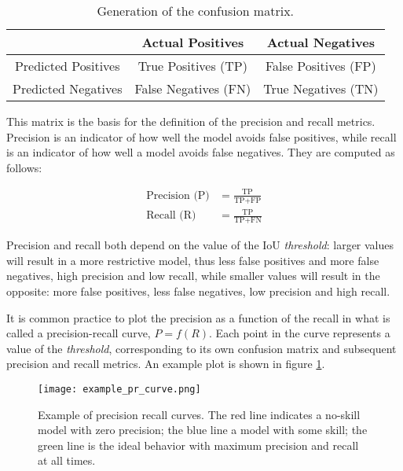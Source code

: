 \begin{table}[ht]
    \begin{center}
        \begin{tabular}{c||c|c}
            \space & Actual Positives & Actual Negatives\\
            \hline\hline
            Predicted Positives & True Positives (TP)& False Positives (FP)\\
            \hline
            Predicted Negatives & False Negatives (FN)& True Negatives (TN)\\
        \end{tabular}
        \caption{Generation of the confusion matrix.}
        \label{confusionmatrix}
    \end{center}
\end{table}

This matrix is the basis for the definition of the precision and recall metrics. Precision is an indicator of how well the model avoids false positives, while recall is an indicator of how well a model avoids false negatives. They are computed as follows:

\begin{align*}
    \text{Precision (P)} &= \frac{\text{TP}}{\text{TP} + \text{FP}}\\
    \text{Recall (R)} &= \frac{\text{TP}}{\text{TP} + \text{FN}}
\end{align*}

Precision and recall both depend on the value of the IoU \emph{threshold}: larger values will result in a more restrictive model, thus less false positives and more false negatives, high precision and low recall, while smaller values will result in the opposite: more false positives, less false negatives, low precision and high recall.

It is common practice to plot the precision as a function of the recall in what is called a precision-recall curve, $P = f(R)$. Each point in the curve represents a value of the \emph{threshold}, corresponding to its own confusion matrix and subsequent precision and recall metrics. An example plot is shown in figure \ref{example_pr}.

\begin{figure}[ht]
    \texttt{[image: example\_pr\_curve.png]}
    \caption{Example of precision recall curves. The red line indicates a no-skill model with zero precision; the blue line a model with some skill; the green line is the ideal behavior with maximum precision and recall at all times.}
    \label{example_pr}
\end{figure}

